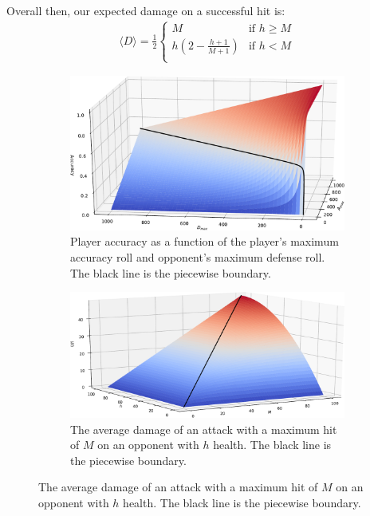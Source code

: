 \documentclass[../../main.tex]{subfiles}
\begin{document}
			Overall then, our expected damage on a successful hit is:
			\begin{align}
				\boxed{
					\langle D \rangle = \frac{1}{2}\begin{cases}
						M &\text{if $h \ge M$} \\
						h\left(2 - \frac{h + 1}{M+1}\right) &\text{if $h < M$} \\
					\end{cases}
				}
			\end{align}

			\begin{figure}
				\centering
				\begin{subfigure}{.45\textwidth}
					\centering
					\includegraphics[width=\linewidth]{img/Accuracy-crop.pdf}
					\caption{Player accuracy as a function of the player's maximum accuracy roll and opponent's maximum defense roll. The black line is the piecewise boundary.}
					\label{fig:accuracy}
				\end{subfigure}
				\begin{subfigure}{0.04\textwidth}\end{subfigure}
				\begin{subfigure}{.45\textwidth}
					\centering
					\includegraphics[width=\linewidth]{img/average_d-crop.pdf}
					\caption{The average damage of an attack with a maximum hit of $M$ on an opponent with $h$ health. The black line is the piecewise boundary.}
					\label{fig:average_d}
				\end{subfigure}
			\end{figure}
\end{document}
